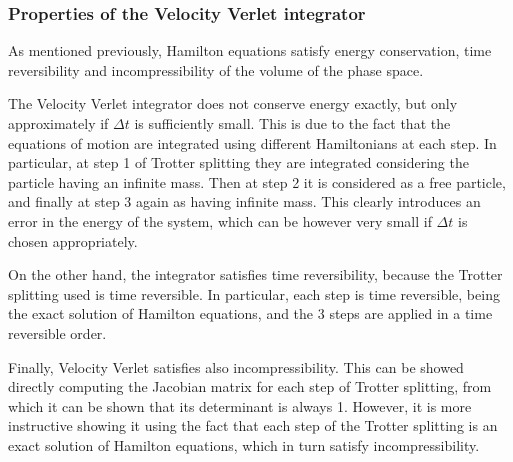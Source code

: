 		\subsubsection{Properties of the Velocity Verlet integrator}\label{chapt:properites_vel_verlet}
		As mentioned previously, Hamilton equations satisfy energy conservation, time reversibility and incompressibility of the volume of the phase space. 
		
		The Velocity Verlet integrator does not conserve energy exactly, but only approximately if $\Delta t$ is sufficiently small. This is due to the fact that the equations of motion are integrated using different Hamiltonians at each step. In particular, at step 1 of Trotter splitting they are integrated considering the particle having an infinite mass. Then at step 2 it is considered as a free particle, and finally at step 3 again as having infinite mass. This clearly introduces an error in the energy of the system, which can be however very small if $\Delta t$ is chosen appropriately.
		
		On the other hand, the integrator satisfies time reversibility, because the Trotter splitting used is time reversible. In particular, each step is time reversible, being the exact solution of Hamilton equations, and the 3 steps are applied in a time reversible order.
		
		Finally, Velocity Verlet satisfies also incompressibility. This can be showed directly computing the Jacobian matrix for each step of Trotter splitting, from which it can be shown that its determinant is always 1. However, it is more instructive showing it using the fact that each step of the Trotter splitting is an exact solution of Hamilton equations, which in turn satisfy incompressibility.